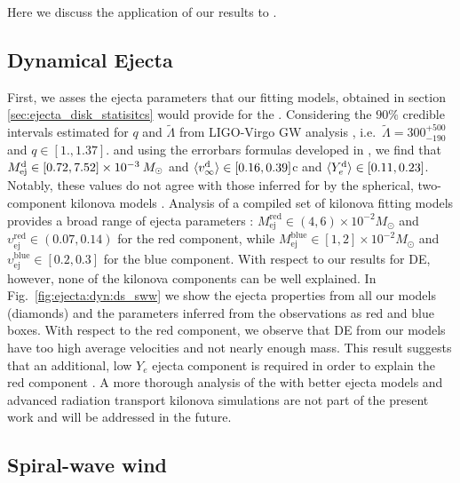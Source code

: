 Here we discuss the application of our results to \GW{}.


\subsection{Dynamical Ejecta}


First, we asses the ejecta parameters that our fitting models, 
obtained in section \ref{sec:ejecta_disk_statisitcs} would provide for the \GW{}.
Considering the $90\%$ credible intervals estimated for $q$ and $\tilde{\Lambda}$ 
from LIGO-Virgo GW analysis
\citep{TheLIGOScientific:2017qsa,Abbott:2018wiz,De:2018uhw,Abbott:2018exr},
i.e.~$\tilde{\Lambda}=300_{-190}^{+500}$ and $q\in[1., 1.37]$. 
and using the errorbars formulas developed in \cite{Radice:2018pdn}, we find that
$M^{\text{d}}_{\text{ej}} \in [0.72, 7.52] \times 10^{-3}\: M_{\odot}$
and
$\langle v^{\text{d}}_\infty\rangle \in [0.16, 0.39]$c 
and 
$\langle Y^{\text{d}}_{e}\rangle \in [0.11, 0.23]$.
Notably, these values do not agree with those inferred for \AT{} by the spherical, 
two-component kilonova models \citep{Villar:2017wcc}.
Analysis of a compiled set of kilonova fitting models provides a broad range of ejecta 
parameters \citep{Siegel:2019mlp}:
$M_{\text{ej}}^{\text{red}}\in(4, 6)\times10^{-2}M_{\odot}$ and
$\upsilon_{\text{ej}}^{\text{red}}\in(0.07, 0.14)$ for the red component, while
$M_{\text{ej}}^{\text{blue}}\in[1, 2]\times10^{-2}M_{\odot}$ and 
$\upsilon_{\text{ej}}^{\text{blue}}\in[0.2, 0.3]$ for the blue component.
With respect to our results for \ac{DE}, however, 
none of the kilonova components can be well explained.
In Fig.~\ref{fig:ejecta:dyn:ds_sww} we show the ejecta properties from
all our models (diamonds) and the parameters inferred from the
observations as red and blue boxes. 
With respect to the red component, we observe that \ac{DE} from our models 
have too high average velocities and not nearly enough mass.
This result suggests that an additional, low $Y_e$ ejecta component is required
in order to explain the \AT{} red component 
\citep{Perego:2017wtu,Kawaguchi:2018ptg,Nedora:2019jhl}.
A more thorough analysis of the \AT{} with better ejecta models and advanced
radiation transport kilonova simulations are not part of the present work 
and will be addressed in the future.


\subsection{Spiral-wave wind}


